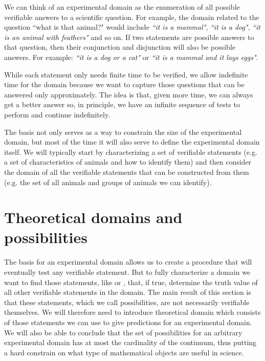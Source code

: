 \documentclass[11pt,letterpaper,fleqn]{memoir} %
\begin{document}
We can think of an experimental domain as the enumeration of all possible verifiable answers to a scientific question. For example, the domain related to the question ``what is that animal?" would include \emph{``it is a mammal"}, \emph{``it is a dog"}, \emph{``it is an animal with feathers"} and so on. If two statements are possible answers to that question, then their conjunction and disjunction will also be possible answers. For example: \emph{``it is a dog or a cat"} or \emph{``it is a mammal and it lays eggs"}.

While each statement only needs finite time to be verified, we allow indefinite time for the domain because we want to capture those questions that can be answered only approximately. The idea is that, given more time, we can always get a better answer so, in principle, we have an infinite sequence of tests to perform and continue indefinitely.

The basis not only serves as a way to constrain the size of the experimental domain, but most of the time it will also serve to define the experimental domain itself. We will typically start by characterizing a set of verifiable statements (e.g. a set of characteristics of animals and how to identify them) and then consider the domain of all the verifiable statements that can be constructed from them (e.g. the set of all animals and groups of animals we can identify).

\section{Theoretical domains and possibilities}

The basis for an experimental domain allows us to create a procedure that will eventually test any verifiable statement. But to fully characterize a domain we want to find those statements, like  or , that, if true, determine the truth value of all other verifiable statements in the domain. The main result of this section is that these statements, which we call possibilities, are not necessarily verifiable themselves. We will therefore need to introduce theoretical domain which consists of those statements we can use to give predictions for an experimental domain. We will also be able to conclude that the set of possibilities for an arbitrary experimental domain has at most the cardinality of the continuum, thus putting a hard constrain on what type of mathematical objects are useful in science.
\end{document}
